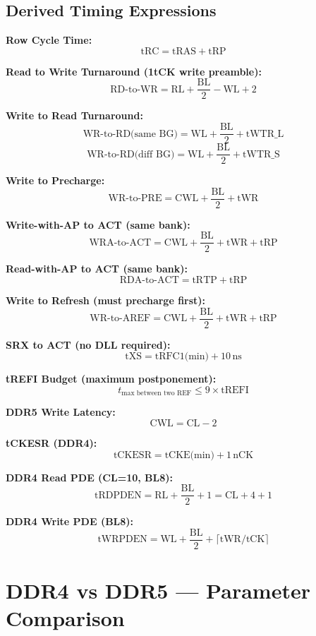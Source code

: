 \documentclass[11pt,a4paper]{article}
\begin{document}
\begin{mdframed}[backgroundcolor=lightgray, linecolor=ddrblue, linewidth=1.2pt, roundcorner=5pt]
\subsection*{Derived Timing Expressions}
\vspace{0.3em}

\textbf{Row Cycle Time:}
\[ \text{tRC} = \text{tRAS} + \text{tRP} \]

\textbf{Read to Write Turnaround (1tCK write preamble):}
\[ \text{RD-to-WR} = \text{RL} + \frac{\text{BL}}{2} - \text{WL} + 2 \]

\textbf{Write to Read Turnaround:}
\[ \text{WR-to-RD(same BG)} = \text{WL} + \frac{\text{BL}}{2} + \text{tWTR\_L} \]
\[ \text{WR-to-RD(diff BG)}  = \text{WL} + \frac{\text{BL}}{2} + \text{tWTR\_S} \]

\textbf{Write to Precharge:}
\[ \text{WR-to-PRE} = \text{CWL} + \frac{\text{BL}}{2} + \text{tWR} \]

\textbf{Write-with-AP to ACT (same bank):}
\[ \text{WRA-to-ACT} = \text{CWL} + \frac{\text{BL}}{2} + \text{tWR} + \text{tRP} \]

\textbf{Read-with-AP to ACT (same bank):}
\[ \text{RDA-to-ACT} = \text{tRTP} + \text{tRP} \]

\textbf{Write to Refresh (must precharge first):}
\[ \text{WR-to-AREF} = \text{CWL} + \frac{\text{BL}}{2} + \text{tWR} + \text{tRP} \]

\textbf{SRX to ACT (no DLL required):}
\[ \text{tXS} = \text{tRFC1(min)} + 10\,\text{ns} \]

\textbf{tREFI Budget (maximum postponement):}
\[ t_{\text{max between two REF}} \leq 9 \times \text{tREFI} \]

\textbf{DDR5 Write Latency:}
\[ \text{CWL} = \text{CL} - 2 \]

\textbf{tCKESR (DDR4):}
\[ \text{tCKESR} = \text{tCKE(min)} + 1\,\text{nCK} \]

\textbf{DDR4 Read PDE (CL=10, BL8):}
\[ \text{tRDPDEN} = \text{RL} + \frac{\text{BL}}{2} + 1 = \text{CL} + 4 + 1 \]

\textbf{DDR4 Write PDE (BL8):}
\[ \text{tWRPDEN} = \text{WL} + \frac{\text{BL}}{2} + \lceil \text{tWR} / \text{tCK} \rceil \]
\end{mdframed}

\section{DDR4 vs DDR5 — Parameter Comparison}
\end{document}
